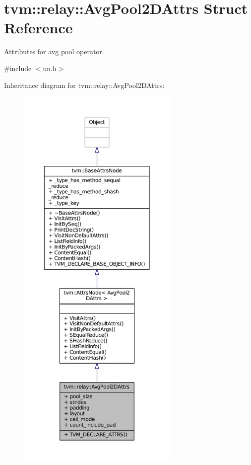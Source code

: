 \hypertarget{structtvm_1_1relay_1_1AvgPool2DAttrs}{}\section{tvm\+:\+:relay\+:\+:Avg\+Pool2\+D\+Attrs Struct Reference}
\label{structtvm_1_1relay_1_1AvgPool2DAttrs}


Attributes for avg pool operator.  




{\ttfamily \#include $<$nn.\+h$>$}



Inheritance diagram for tvm\+:\+:relay\+:\+:Avg\+Pool2\+D\+Attrs\+:
\nopagebreak
\begin{figure}[H]
\begin{center}
\leavevmode
\includegraphics[height=550pt]{structtvm_1_1relay_1_1AvgPool2DAttrs__inherit__graph}
\end{center}
\end{figure}


